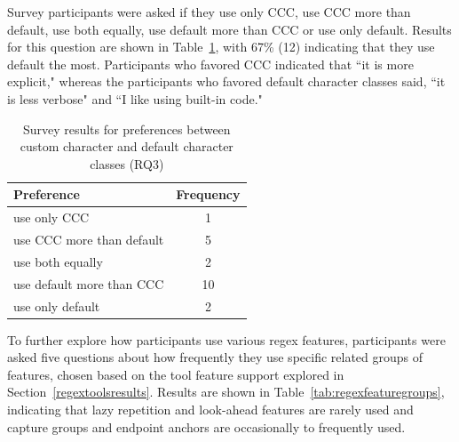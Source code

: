 Survey participants were asked if they use only CCC, use CCC more than default, use both equally, use default more than CCC or use only default.  Results for this question are shown in Table~\ref{tab:cccvsdefault}, with 67\% (12) indicating that they use default the most.
Participants who favored CCC indicated that ``it is more explicit," whereas the participants who favored default character classes said,  ``it is less verbose" and ``I like using built-in code."



\begin{table}
\caption{Survey results for preferences between custom character and default character classes (RQ3) \label{tab:cccvsdefault}}
\begin{center}
\begin{small}
\begin{tabular}{l|c}
\toprule
\textbf{Preference} & \textbf{Frequency} \\  \hline \bigstrut
use only CCC & 1\\ \hline \bigstrut
use CCC more than default & 5 \\ \hline \bigstrut
use both equally & 2\\ \hline \bigstrut
use default more than CCC & 10\\ \hline \bigstrut
use only default & 2\\
\bottomrule
\end{tabular}
\end{small}
\end{center}
\vspace{-12pt}
\end{table}

To further explore how participants use various regex features, participants were asked five questions about how frequently they use specific related groups of features, chosen based on the tool feature support explored in Section~\ref{regextoolsresults}.
Results are shown in Table~\ref{tab:regexfeaturegroups}, indicating that lazy repetition and look-ahead features are rarely used and capture groups and endpoint anchors are occasionally to frequently used.



